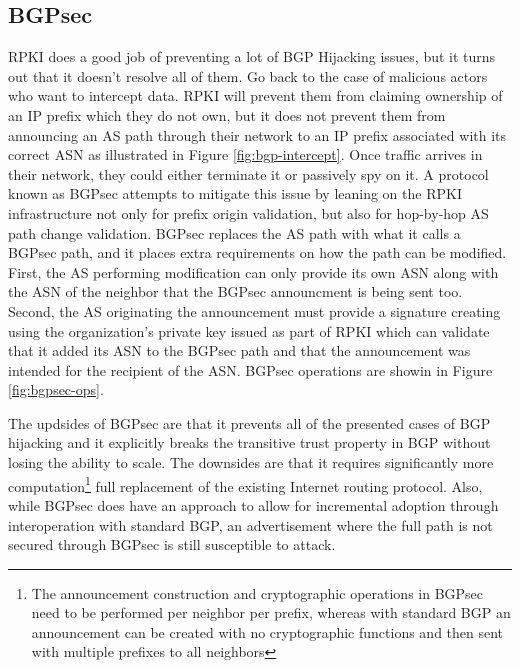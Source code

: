 \documentclass[conference]{IEEEtran}
\begin{document}
\subsection{BGPsec}
RPKI does a good job of preventing a lot of BGP Hijacking issues, but it turns out that it doesn't resolve all of them.  Go back to the case of malicious actors who want to intercept data.  RPKI will prevent them from claiming ownership of an IP prefix which they do not own, but it does not prevent them from announcing an AS path through their network to an IP prefix associated with its correct ASN as illustrated in Figure \ref{fig:bgp-intercept}.  Once traffic arrives in their network, they could either terminate it or passively spy on it.  A protocol known as BGPsec attempts to mitigate this issue by leaning on the RPKI infrastructure not only for prefix origin validation, but also for hop-by-hop AS path change validation.  BGPsec replaces the AS path with what it calls a BGPsec path, and it places extra requirements on how the path can be modified.  First, the AS performing modification can only provide its own ASN along with the ASN of the neighbor that the BGPsec announcment is being sent too.  Second, the AS originating the announcement must provide a signature creating using the organization's private key issued as part of RPKI which can validate that it added its ASN to the BGPsec path and that the announcement was intended for the recipient of the ASN.  BGPsec operations are showin in Figure \ref{fig:bgpsec-ops}.

The updsides of BGPsec are that it prevents all of the presented cases of BGP hijacking and it explicitly breaks the transitive trust property in BGP without losing the ability to scale.  The downsides are that it requires significantly more computation\footnote{The announcement construction and cryptographic operations in BGPsec need to be performed per neighbor per prefix, whereas with standard BGP an announcement can be created with no cryptographic functions and then sent with multiple prefixes to all neighbors} full replacement of the existing Internet routing protocol.  Also, while BGPsec does have an approach to allow for incremental adoption through interoperation with standard BGP, an advertisement where the full path is not secured through BGPsec is still susceptible to attack.
\end{document}
